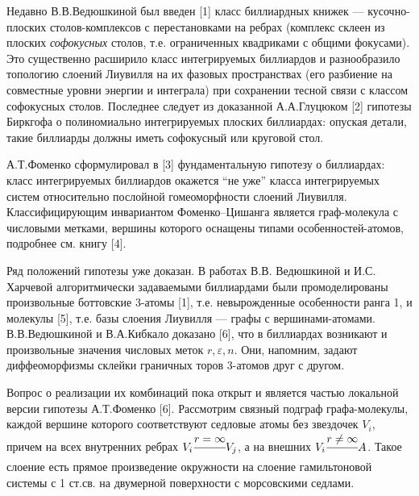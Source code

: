 
\vzmscaption

Недавно В.В.Ведюшкиной был введен [1] класс биллиардных книжек --- кусочно-плоских столов-комплексов с перестановками на ребрах (комплекс склеен из плоских \textit{софокусных} столов, т.е. ограниченных квадриками с общими фокусами). Это существенно расширило класс интегрируемых биллиардов и разнообразило топологию слоений Лиувилля на их фазовых пространствах (его разбиение на совместные уровни энергии и интеграла) при сохранении тесной связи с классом софокусных столов. Последнее следует из доказанной А.А.Глуцюком [2] гипотезы Биркгофа о полиномиально интегрируемых плоских биллиардах: опуская детали, такие биллиарды должны иметь  софокусный или круговой стол. 

А.Т.Фоменко сформулировал в [3] фундаментальную гипотезу о биллиардах:  класс интегрируемых биллиардов окажется ``не уже'' класса интегрируемых систем относительно послойной гомеоморфности слоений Лиувилля. Классифицирующим инвариантом Фоменко--Цишанга является граф-молекула с числовыми метками, вершины которого оснащены типами особенностей-атомов, подробнее см. книгу [4].

Ряд положений гипотезы уже доказан. В работах В.В. Ведюшкиной и И.С. Харчевой алгоритмически задаваемыми биллиардами были промоделированы произвольные боттовские 3-атомы [1], т.е. невырожденные особенности ранга 1, и молекулы [5], т.е. базы слоения Лиувилля --- графы с вершинами-атомами. В.В.Ведюшкиной и В.А.Кибкало доказано [6], что в биллиардах возникают и произвольные значения числовых меток $r, \varepsilon, n$. Они, напомним, задают диффеоморфизмы склейки граничных торов 3-атомов друг с другом.

Вопрос о реализации их комбинаций пока открыт и является частью локальной версии гипотезы А.Т.Фоменко [6]. Рассмотрим связный подграф графа-молекулы, каждой вершине которого соответствуют седловые атомы без звездочек $V_i$, причем на всех внутренних ребрах $V_i \cfrac{r = \infty}{}V_j$, а на внешних $V_i \cfrac{r \ne \infty}{}A$. Такое слоение есть прямое произведение окружности на слоение гамильтоновой системы с 1 ст.св. на двумерной поверхности с морсовскими седлами. 

